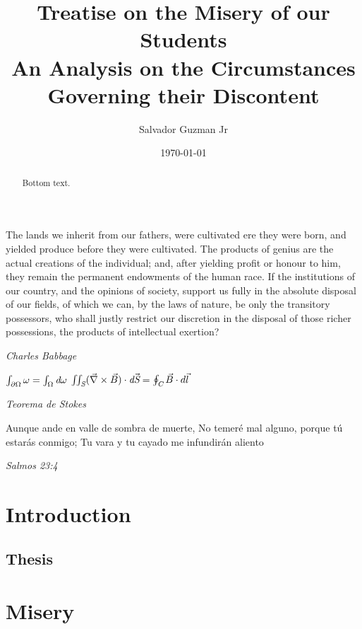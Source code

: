 \documentclass[UTF8]{article}
\title{%
	Treatise on the Misery of our Students\\
	\large An Analysis on the Circumstances Governing their Discontent
}
\author{Salvador Guzman Jr}
\date{\today}
\begin{document}
	\maketitle
	\newpage

	\begin{abstract}
		Bottom text.
	\end{abstract}

	\newpage

	\begin{center}
		\epigraph{
			The lands we inherit from our fathers, were cultivated ere they were born, and yielded produce before they were cultivated. The products of genius are the actual creations of the individual; and, after yielding profit or honour to him, they remain the permanent endowments of the human race. If the institutions of our country, and the opinions of society, support us fully in the absolute disposal of our fields, of which we can, by the laws of nature, be only the transitory possessors, who shall justly restrict our discretion in the disposal of those richer possessions, the products of intellectual exertion?
		}{\textit{Charles Babbage}}
		\epigraph{
			\begin{math}
				\int_{\partial\Omega} \omega=\int_{\Omega} \emph{d}\omega
			\end{math}
			\linebreak
			\linebreak
			\begin{math}
				\iint_{\emph{S}}(\vec{\nabla}\times\vec{B})\cdot \emph{d}\vec{\emph{S}}=\oint_{\emph{C}}\vec{B}\cdot d \vec{l}
			\end{math}
		}{
			\textit{Teorema de Stokes}
		}
		
		\epigraph{
			Aunque ande en valle de sombra de muerte,
			No temer\'{e} mal alguno, porque t\'{u} estarás conmigo;
			Tu vara y tu cayado me infundir\'{a}n aliento
		}{
			\textit{Salmos 23:4}
		}
	\end{center}

	\newpage
	\tableofcontents
	\newpage
	
	\section{Introduction}
	\subsection{Thesis}
	\section{Misery}
\end{document}
